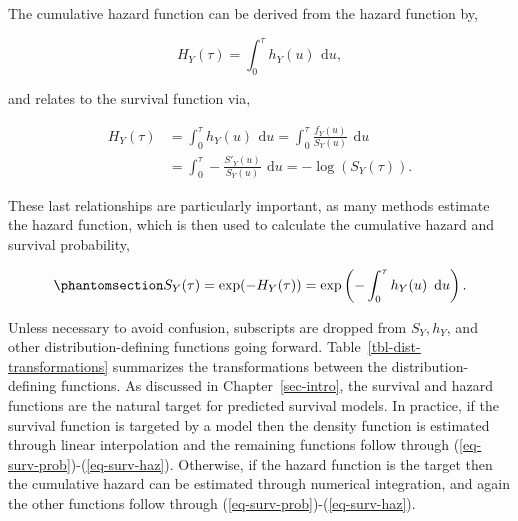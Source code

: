 \documentclass[
  letterpaper,
  krantz2]{style/krantz}
\begin{document}
The cumulative hazard function can be
derived from the hazard function by,

\[
H_Y(\tau) = \int^\tau_0 h_Y(u) \ \,\mathrm{d}u,
\]

and relates to the survival function via,

\[
\begin{aligned}
H_Y(\tau) & = \int^\tau_0 h_Y(u) \ \,\mathrm{d}u= \int^\tau_0 \frac{f_Y(u)}{S_Y(u)} \ \,\mathrm{d}u\\
          & = \int^\tau_0 -\frac{S'_Y(u)}{S_Y(u)} \ \,\mathrm{d}u= -\log(S_Y(\tau)).
\end{aligned}
\]

These last relationships are particularly important, as many methods
estimate the hazard function, which is then used to calculate the
cumulative hazard and survival probability,

\begin{equation}\phantomsection\label{eq-surv-haz}{
S_Y(\tau) = \exp(-H_Y(\tau)) = \exp\left(-\int_0^\tau h_Y(u)\ \,\mathrm{d}u\right).
}\end{equation}

Unless necessary to avoid confusion, subscripts are dropped from
\(S_Y, h_Y\), and other distribution-defining functions going forward.
Table~\ref{tbl-dist-transformations} summarizes the transformations
between the distribution-defining functions. As discussed in
Chapter~\ref{sec-intro}, the survival and hazard functions are the
natural target for predicted survival models. In practice, if the
survival function is targeted by a model then the density function is
estimated through linear interpolation and the remaining functions
follow through (\ref{eq-surv-prob})-(\ref{eq-surv-haz}). Otherwise, if
the hazard function is the target then the cumulative hazard can be
estimated through numerical integration, and again the other functions
follow through (\ref{eq-surv-prob})-(\ref{eq-surv-haz}).
\end{document}

